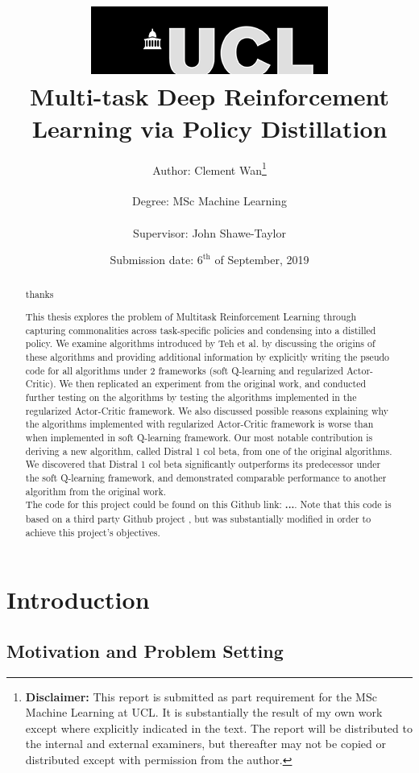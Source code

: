 \documentclass[12pt]{report}
\title{  	{ \includegraphics[scale=.5]{figs/ucl_logo.png}}\\
{{\Huge Multi-task Deep Reinforcement Learning via Policy Distillation}}\\
		}
\date{Submission date: $6^{\text{th}}$ of September, 2019}
\author{Author: Clement Wan\thanks{
{\bf Disclaimer:}
This report is submitted as part requirement for the MSc Machine Learning at UCL. It is
substantially the result of my own work except where explicitly indicated in the text. The report will be distributed to the internal and external examiners, but thereafter may not be copied or distributed except with permission from the author.
}
\\ \\
Degree: MSc Machine Learning\\ \\
Supervisor: John Shawe-Taylor}
\begin{document}
 
\onehalfspacing
\maketitle
\renewcommand{\abstractname}{Acknowledgements}
\begin{abstract}
 thanks
\end{abstract}
\renewcommand{\abstractname}{Abstract}
\begin{abstract}
This thesis explores the problem of Multitask Reinforcement Learning through capturing commonalities across task-specific policies and condensing into a distilled policy. We examine algorithms introduced by Teh et al. \cite{teh2017distral} by discussing the origins of these algorithms and providing additional information by explicitly writing the pseudo code for all algorithms under 2 frameworks (soft Q-learning and regularized Actor-Critic). We then replicated an experiment from the original work, and conducted further testing on the algorithms by testing the algorithms implemented in the regularized Actor-Critic framework. We also discussed possible reasons explaining why the algorithms implemented with regularized Actor-Critic framework is worse than when implemented in soft Q-learning framework. Our most notable contribution is deriving a new algorithm, called Distral 1 col beta, from one of the original algorithms. We discovered that Distral 1 col beta significantly outperforms its predecessor under the soft Q-learning framework, and demonstrated comparable performance to another algorithm from the original work.\\

The code for this project could be found on this Github link: \textbf{...}. Note that this code is based on a third party Github project \cite{alfredo_github}, but was substantially modified in order to achieve this project's objectives.
\end{abstract}
\tableofcontents
\setcounter{page}{1}


\chapter{Introduction}


\section{Motivation and Problem Setting}
\end{document}
